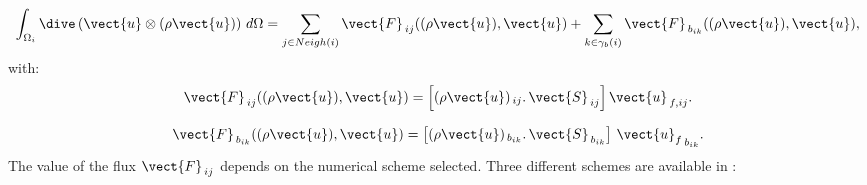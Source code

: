\begin{equation*}
\int_{\Omega_i}{\dive\left(\vect{u}\otimes (\rho \vect{u})\right)\, d\Omega} =
\sum_{j\in Neigh(i)}{\vect{F}_{\,ij}((\rho \vect{u}), \vect{u})} \\
+\sum_{k\in {\gamma_b(i)}} {\vect{F}_{\,{b}_{ik}}((\rho \vect{u}),\vect{u})} ,
\end{equation*}
%
with:
\begin{equation}
\vect{F}_{\,ij}((\rho \vect{u}), \vect{u}) = \left[{(\rho \vect{u})_{\,ij}} \text{.}\, \vect{S}_{\,ij}\right]
 \vect{u}_{\,f,ij}.
\end{equation}

\begin{equation}
{\vect{F}_{\,{b}_{ik}}}((\rho \vect{u}),\vect{u}) =  \left[{(\rho \vect{u})_{\,{b}_{ik}}} \text{.}\, \vect{S}_{\,{b}_{ik}}\right]\,{\vect{u}_f}_{\,{b}_{ik}}.
\end{equation}
The value of the flux ${\vect{F}_{\,ij}}$ depends on the numerical scheme
selected. Three different schemes are available in \CS:
%
